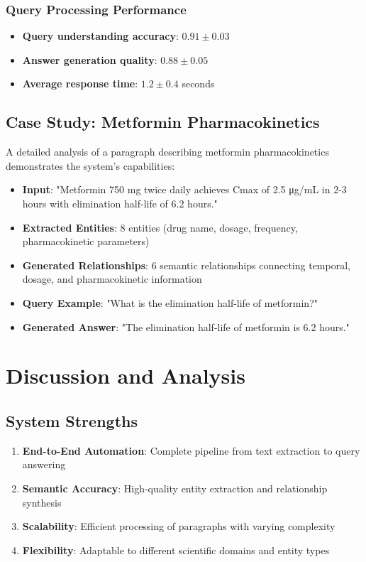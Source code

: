 \documentclass[conference]{IEEEtran}
\begin{document}
\subsubsection{Query Processing Performance}
\begin{itemize}
\item \textbf{Query understanding accuracy}: $0.91 \pm 0.03$
\item \textbf{Answer generation quality}: $0.88 \pm 0.05$
\item \textbf{Average response time}: $1.2 \pm 0.4$ seconds
\end{itemize}

\subsection{Case Study: Metformin Pharmacokinetics}
A detailed analysis of a paragraph describing metformin pharmacokinetics demonstrates the system's capabilities:
\begin{itemize}
\item \textbf{Input}: "Metformin 750 mg twice daily achieves Cmax of 2.5 μg/mL in 2-3 hours with elimination half-life of 6.2 hours."
\item \textbf{Extracted Entities}: 8 entities (drug name, dosage, frequency, pharmacokinetic parameters)
\item \textbf{Generated Relationships}: 6 semantic relationships connecting temporal, dosage, and pharmacokinetic information
\item \textbf{Query Example}: "What is the elimination half-life of metformin?"
\item \textbf{Generated Answer}: "The elimination half-life of metformin is 6.2 hours."
\end{itemize}

\section{Discussion and Analysis}

\subsection{System Strengths}
\begin{enumerate}
\item \textbf{End-to-End Automation}: Complete pipeline from text extraction to query answering
\item \textbf{Semantic Accuracy}: High-quality entity extraction and relationship synthesis
\item \textbf{Scalability}: Efficient processing of paragraphs with varying complexity
\item \textbf{Flexibility}: Adaptable to different scientific domains and entity types
\end{enumerate}
\end{document}
